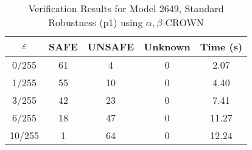 \begin{table}[htbp]
\centering
\caption{Verification Results for Model 2649, Standard Robustness (p1) using $\alpha,\beta$-CROWN}
\label{tab:model2649_p1_abcrown}
\begin{tabular}{|c|c|c|c|c|}
\hline
$\varepsilon$ & SAFE & UNSAFE & Unknown & Time (s) \\ \hline
0/255 & 61 & 4 & 0 & 2.07 \\ \hline
1/255 & 55 & 10 & 0 & 4.40 \\ \hline
3/255 & 42 & 23 & 0 & 7.41 \\ \hline
6/255 & 18 & 47 & 0 & 11.27 \\ \hline
10/255 & 1 & 64 & 0 & 12.24 \\ \hline
\end{tabular}
\end{table}
